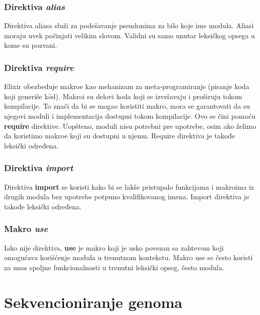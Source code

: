 \documentclass[12pt,oneside]{memoir}
\begin{document}


\subsection{Direktiva \textit{alias}}
Direktiva aliasa služi za podešavanje pseudonima za bilo koje ime modula. Aliasi moraju uvek počinjati velikim slovom. Validni su samo unutar leksičkog opsega u kome su pozvani.

\subsection{Direktiva \textit{require}}
Elixir obezbeđuje makroe kao mehanizam za meta-programiranje (pisanje koda koji generiše k$\hat{o}$d). Makroi su delovi koda koji se izvršavaju i proširuju tokom kompilacije. To znači da bi se mogao koristiti makro, mora se garantovati da su njegovi moduli i implementacija dostupni tokom kompilacije. Ovo se čini pomoću \textbf{require} direktive. Uopšteno, moduli nisu potrebni pre upotrebe, osim ako želimo da koristimo makroe koji su dostupni u njemu. Require direktiva je takođe leksički određena.

\subsection{Direktiva \textit{import}}
Direktiva \textbf{import} se koristi kako bi se lakše pristupalo funkcijama i makroima iz drugih modula bez upotrebe potpuno kvalifikovanog imena. Import direktiva je takođe leksički određena. 

\subsection{Makro \textit{use}}
Iako nije direktiva, \textbf{use} je makro koji je usko povezan sa zahtevom koji omogućava korišćenje modula u trenutnom kontekstu. Makro use se često koristi za unos spoljne funkcionalnosti u trenutni leksički opseg, često modula.


\chapter{Sekvencioniranje genoma}
\label{poglavlje:Bio}
\end{document}
